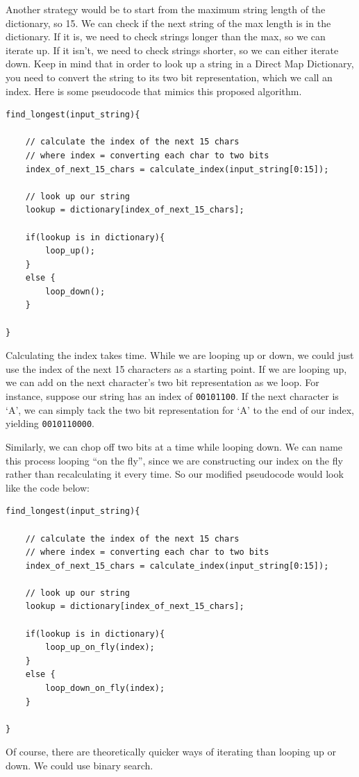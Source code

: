 \documentclass[12pt,twoside]{reedthesis}
\begin{document}
Another strategy would be to start from the maximum string length of the dictionary, so 15. We can check if the next string of the max length is in the dictionary. If it is, we need to check strings longer than the max, so we can iterate up. If it isn't, we need to check strings shorter, so we can either iterate down. Keep in mind that in order to look up a string in a Direct Map Dictionary, you need to convert the string to its two bit representation, which we call an index. Here is some pseudocode that mimics this proposed algorithm.
\begin{verbatim}
find_longest(input_string){

    // calculate the index of the next 15 chars
    // where index = converting each char to two bits
    index_of_next_15_chars = calculate_index(input_string[0:15]);

    // look up our string
    lookup = dictionary[index_of_next_15_chars];

    if(lookup is in dictionary){
        loop_up();
    }
    else {
        loop_down();
    }
    
}
\end{verbatim}
Calculating the index takes time. While we are looping up or down, we could just use the index of the next 15 characters as a starting point. If we are looping up, we can add on the next character's two bit representation as we loop. For instance, suppose our string has an index of \texttt{00101100}. If the next character is `A', we can simply tack the two bit representation for `A' to the end of our index, yielding \texttt{00101100\textbar{}00}.

Similarly, we can chop off two bits at a time while looping down. We can name this process looping ``on the fly'', since we are constructing our index on the fly rather than recalculating it every time. So our modified pseudocode would look like the code below:
\begin{verbatim}
find_longest(input_string){

    // calculate the index of the next 15 chars
    // where index = converting each char to two bits
    index_of_next_15_chars = calculate_index(input_string[0:15]);

    // look up our string
    lookup = dictionary[index_of_next_15_chars];

    if(lookup is in dictionary){
        loop_up_on_fly(index);
    }
    else {
        loop_down_on_fly(index);
    }
    
}
\end{verbatim}
Of course, there are theoretically quicker ways of iterating than looping up or down. We could use binary search.
\end{document}
